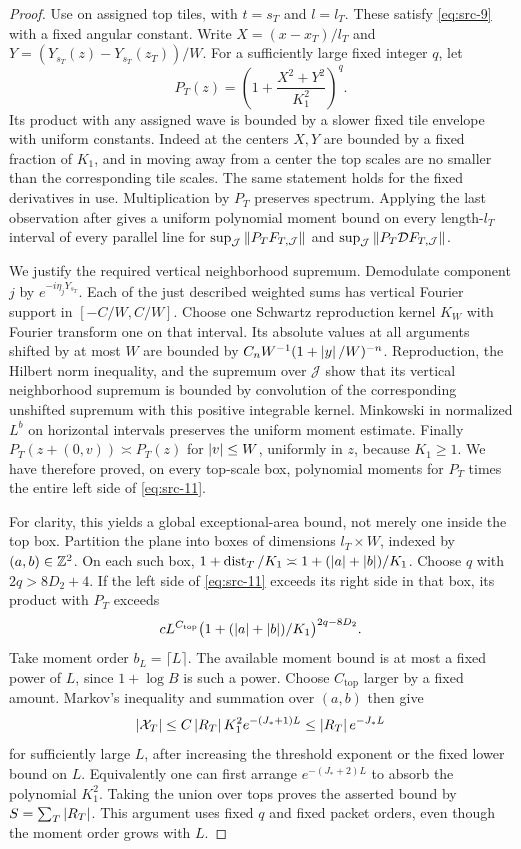 \begin{proof}
Use  on assigned top tiles, with
$t=s_T$ and $l=l_T$.  These satisfy \eqref{eq:src-9} with a fixed
angular constant.  Write $X=(x-x_T)/l_T$ and
$Y=(Y_{s_T}(z)-Y_{s_T}(z_T))/W$.  For a sufficiently large fixed integer
$q$, let
\[
 P_T(z)=\left(1+\frac{X^2+Y^2}{K_1^2}\right)^q.
\]
Its product with any assigned wave is bounded by a slower fixed tile
envelope with uniform constants.  Indeed at the centers $X,Y$ are
bounded by a fixed fraction of $K_1$, and in moving away from a center
the top scales are no smaller than the corresponding tile scales.
The same statement holds for the fixed derivatives in use.
Multiplication by $P_T$ preserves spectrum.  Applying the last
observation after  gives a uniform polynomial
moment bound on every length-$l_T$ interval of every parallel line
for
$\sup_{\mathcal J}\left\|P_TF_{T,\mathcal J}\right\|$ and
$\sup_{\mathcal J}\left\|P_T\mathcal D F_{T,\mathcal J}\right\|$.

We justify the required vertical neighborhood supremum.  Demodulate
component $j$ by $e^{-i\eta_jY_{s_T}}$.  Each of the just described
weighted sums has vertical Fourier support in $[-C/W,C/W]$.
Choose one Schwartz reproduction kernel $K_W$ with Fourier transform
one on that interval.  Its absolute values at all arguments shifted
by at most $W$ are bounded by
$C_nW^{-1}(1+\left|y\right|/W)^{-n}$.  Reproduction, the Hilbert norm
inequality, and the supremum over $\mathcal J$ show that its vertical
neighborhood supremum is bounded by convolution of the corresponding
unshifted supremum with this positive integrable kernel.  Minkowski
in normalized $L^b$ on horizontal intervals preserves the uniform
moment estimate.  Finally $P_T(z+(0,v))\asymp P_T(z)$ for
$\left|v\right|\leq W$, uniformly in $z$, because $K_1\geq1$.
We have therefore proved, on every top-scale box, polynomial moments
for $P_T$ times the entire left side of \eqref{eq:src-11}.

For clarity, this yields a global exceptional-area bound, not merely
one inside the top box.  Partition the plane into boxes of dimensions
$l_T\times W$, indexed by $(a,b)\in\mathbb Z^2$.  On each such box,
$1+\operatorname{dist}_T/K_1\asymp1+(\left|a\right|+\left|b\right|)/K_1$.
Choose $q$ with $2q>8D_2+4$.  If the left side of
\eqref{eq:src-11} exceeds its right side in that box, its product
with $P_T$ exceeds
\[
 c L^{C_{\mathrm{top}}}
       \big(1+(\left|a\right|+\left|b\right|)/K_1\big)^{2q-8D_2}.
\]
Take moment order $b_L=\lceil L\rceil$.  The available moment bound is
at most a fixed power of $L$, since $1+\log B$ is such a power.
Choose $C_{\mathrm{top}}$ larger by a fixed amount.  Markov's inequality
and summation over $(a,b)$ then give
\[
 \left|\mathcal X_T\right|
 \leq C\left|R_T\right|K_1^2 e^{-(J_*+1)L}
 \leq \left|R_T\right|e^{-J_*L}
\]
for sufficiently large $L$, after increasing the threshold exponent
or the fixed lower bound on $L$.  Equivalently one can first arrange
$e^{-(J_*+2)L}$ to absorb the polynomial $K_1^2$.
Taking the union over tops proves the asserted bound by
$S=\sum_T\left|R_T\right|$.  This argument uses fixed $q$ and fixed packet
orders, even though the moment order grows with $L$.


\end{proof}
